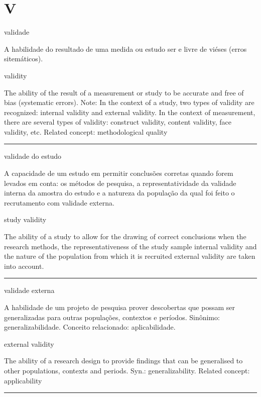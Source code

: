 \documentclass[
  openany]{book}
\begin{document}
\hypertarget{v}{%
\chapter*{V}\label{v}}

validade

A habilidade do resultado de uma medida ou estudo ser e livre de viéses (erros sitemáticos).

validity

The ability of the result of a measurement or study to be accurate and free of bias (systematic errors). Note: In the context of a study, two types of validity are recognized: internal validity and external validity. In the context of measurement, there are several types of validity: construct validity, content validity, face validity, etc. Related concept: methodological quality

\begin{center}\rule{0.5\linewidth}{0.5pt}\end{center}

validade do estudo

A capacidade de um estudo em permitir conclusões corretas quando forem levados em conta: os métodos de pesquisa, a representatividade da validade interna da amostra do estudo e a natureza da população da qual foi feito o recrutamento com validade externa.

study validity

The ability of a study to allow for the drawing of correct conclusions when the research methods, the representativeness of the study sample internal validity and the nature of the population from which it is recruited external validity are taken into account.

\begin{center}\rule{0.5\linewidth}{0.5pt}\end{center}

validade externa

A habilidade de um projeto de pesquisa prover descobertas que possam ser generalizadas para outras populações, contextos e períodos. Sinônimo: generalizabilidade. Conceito relacionado: aplicabilidade.

external validity

The ability of a research design to provide findings that can be generalised to other populations, contexts and periods. Syn.: generalizability. Related concept: applicability

\begin{center}\rule{0.5\linewidth}{0.5pt}\end{center}
\end{document}
